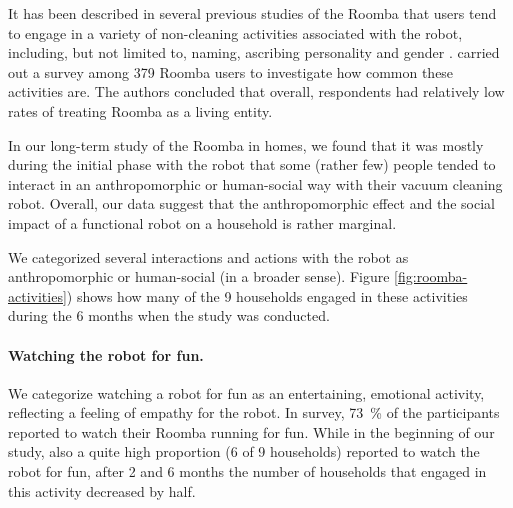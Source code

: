 \documentclass{frontiersSCNS} %
\begin{document}
It has been described in several previous studies of the Roomba that users tend to engage in a variety of non-cleaning activities associated with the robot, including, but not limited to, naming, ascribing personality and gender \citep{forlizzi_service_2006,forlizzi_how_2007,krumm_my_2007,sung_domestic_2010}. \cite{sung_housewives_2008} carried out a survey among 379 Roomba users to investigate how common these activities are. The authors concluded that overall, respondents had relatively low rates of treating Roomba as a living entity.  

In our long-term study of the Roomba in homes, we found that it was mostly during the initial phase with the robot that some (rather few) people tended to interact in an anthropomorphic or human-social way with their vacuum cleaning robot.
Overall, our data suggest that the anthropomorphic effect and the social impact of a functional robot on a household is rather marginal.

We categorized several interactions and actions with the robot as anthropomorphic or human-social (in a broader sense). 
Figure \ref{fig:roomba-activities}) shows how many of the 9 households engaged in these activities during the 6 months when the study was conducted. 

\paragraph*{Watching the robot for fun.} We categorize watching a robot for fun as an entertaining, emotional activity, reflecting a feeling of empathy for the robot. In \cite{sung_housewives_2008} survey, 73~\% of the participants reported to watch their Roomba running for fun. While in the beginning of our study, also a quite high proportion (6 of 9 households) reported to watch the robot for fun, after 2 and 6 months the number of households that engaged in this activity decreased by half. 
\end{document}
